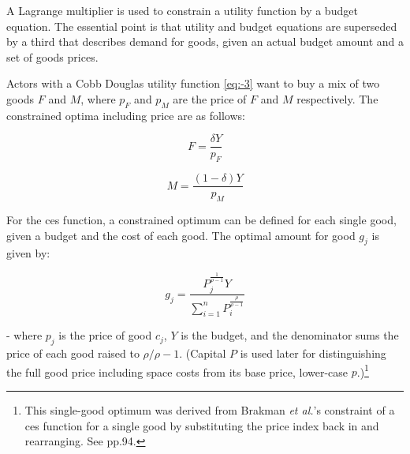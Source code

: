 A Lagrange multiplier is used to constrain a utility function by a budget equation. The essential point is that utility and budget equations are superseded by a third that describes demand for goods, given an actual budget amount and a set of goods prices. 

Actors with a Cobb Douglas utility function \eqref{eq:-3} want to buy a mix of two goods $F$ and $M$, where $p_F$ and $p_M$ are the price of $F$ and $M$ respectively. The constrained optima including price are as follows:

\begin{equation}
F=\frac{\delta Y}{p_F}
\label{eq:optCDF}
\end{equation}
 
\begin{equation}
M=\frac{(1-\delta) Y}{p_M}
\label{eq:optCDM}
\end{equation}

For the \gls{ces} function, a constrained optimum can be defined for each single good, given a budget and the cost of each good. The optimal amount for good $g_j$ is given by:

\begin{equation}
g_j = \frac{P_j^\frac{1}{\rho-1}Y}{\sum_{i=1}^{n}P_i^\frac{\rho}{\rho-1}} \label{eq:CESconstrained}
\end{equation}

- where $p_j$ is the price of good $c_j$, $Y$ is the budget, and the denominator sums the price of each good raised to $\rho/\rho-1$. (Capital $P$ is used later for distinguishing the full good price including space costs from its base price, lower-case $p$.)\footnote{This single-good optimum was derived from Brakman \emph{et al.}'s constraint of a \gls{ces} function for a single good by substituting the price index back in and rearranging. See \citealt{brakman_new_2009} pp.94.}

